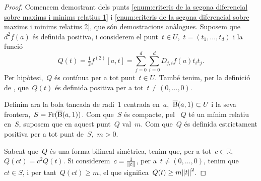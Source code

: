 \documentclass[../../main.tex]{subfiles}
\begin{document}
    \begin{proof}
        Comencem demostrant dels punts \eqref{enum:criteris de la segona diferencial sobre maxims i minims relatius 1} i \eqref{enum:criteris de la segona diferencial sobre maxims i minims relatius 2}, que són demostracions anàlogues.
        Suposem que~\(d^{2}f(a)\) és definida positiva, i considerem el punt~\(t\in U\),~\(t=(t_{1},\dots,t_{d})\) i la funció
        \[
            Q(t)=\tfrac{1}{2}f^{(2)}[a,t]=\sum_{j=0}^{d}\sum_{i=0}^{d}D_{j,i}f(a)t_{i}t_{j}.
        \]
        Per hipòtesi,~\(Q\) és contínua per a tot punt~\(t\in U\).
        També tenim, per la definició de , que~\(Q(t)\) és definida positiva per a tot~\(t\neq(0,\dots,0)\).

        Definim ara la bola tancada de radi~\(1\) centrada en~\(a\),~\(\overline{\operatorname{B}}(a,1)\subset U\) i la seva frontera,~\(S=\operatorname{Fr}(\overline{\operatorname{B}}(a,1))\).
        Com que~\(S\) és compacte, pel  ~\(Q\) té un mínim relatiu en~\(S\), suposem que en aquest punt~\(Q\) val~\(m\).
        Com que~\(Q\) és definida estrictament positiva per a tot punt de~\(S\),~\(m>0\).

        Sabent que~\(Q\) és una forma bilineal simètrica, tenim que, per a tot~\(c\in\mathbb{R}\),~\(Q(ct)=c^{2}Q(t)\).
        Si considerem~\(c=\frac{1}{\norm{t}}\), per a~\(t\neq(0,\dots,0)\), tenim que~\(ct\in S\), i per tant~\(Q(ct)\geq m\), el que significa~\(Q(t)\geq m\norm{t} ^{2}\).


\end{proof}
\end{document}
